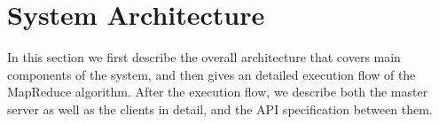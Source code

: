 \section{System Architecture}

In this section we first describe the overall architecture that covers main components of the system, and then gives an detailed execution flow of the MapReduce algorithm. After the execution flow, we describe both the master server as well as the clients in detail, and the API specification between them.





